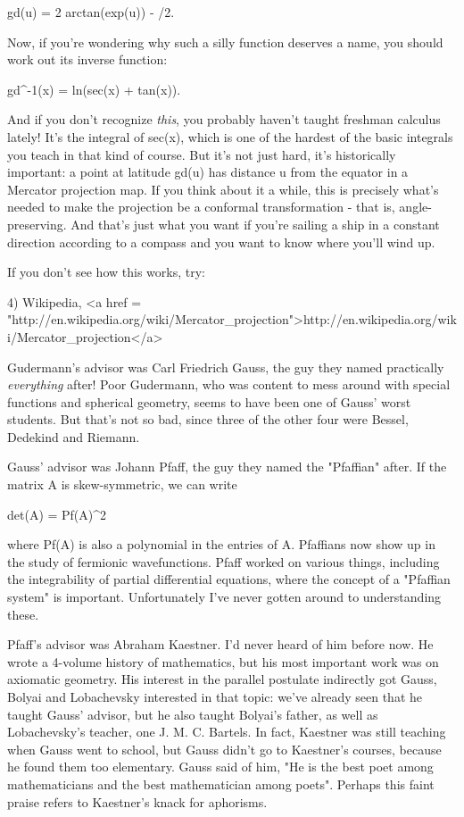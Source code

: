 gd(u) = 2 arctan(exp(u)) - \pi /2.

Now, if you're wondering why such a silly function deserves a name,
you should work out its inverse function:

gd^{-1}(x) = ln(sec(x) + tan(x)).

And if you don't recognize \emph{this}, you probably haven't taught
freshman calculus lately!  It's the integral of sec(x), which is one
of the hardest of the basic integrals you teach in that kind of
course.  But it's not just hard, it's historically important: a point
at latitude gd(u) has distance u from the equator in a Mercator
projection map.  If you think about it a while, this is precisely
what's needed to make the projection be a conformal transformation -
that is, angle-preserving.  And that's just what you want if you're
sailing a ship in a constant direction according to a compass and you
want to know where you'll wind up.

If you don't see how this works, try:

4) Wikipedia, <a href = "http://en.wikipedia.org/wiki/Mercator_projection">http://en.wikipedia.org/wiki/Mercator_projection</a>

Gudermann's advisor was Carl Friedrich Gauss, the guy they named
practically \emph{everything} after!  Poor Gudermann, who was content to mess
around with special functions and spherical geometry, seems to have been
one of Gauss' worst students.  But that's not so bad, since three of the
other four were Bessel, Dedekind and Riemann.   

Gauss' advisor was Johann Pfaff, the guy they named the "Pfaffian"
after.  If the matrix A is skew-symmetric, we can write

det(A) = Pf(A)^{2}

where Pf(A) is also a polynomial in the entries of A.  Pfaffians now
show up in the study of fermionic wavefunctions.  Pfaff worked on
various things, including the integrability of partial differential
equations, where the concept of a "Pfaffian system" is important.
Unfortunately I've never gotten around to understanding these.

Pfaff's advisor was Abraham Kaestner.  I'd never heard of him before
now.  He wrote a 4-volume history of mathematics, but his most important
work was on axiomatic geometry.  His interest in the parallel postulate
indirectly got Gauss, Bolyai and Lobachevsky interested in that topic:
we've already seen that he taught Gauss' advisor, but he also taught
Bolyai's father, as well as Lobachevsky's teacher, one J. M. C. Bartels.
In fact, Kaestner was still teaching when Gauss went to school, but
Gauss didn't go to Kaestner's courses, because he found them too
elementary.  Gauss said of him, "He is the best poet among
mathematicians and the best mathematician among poets".  Perhaps 
this faint praise refers to Kaestner's knack for aphorisms.    


